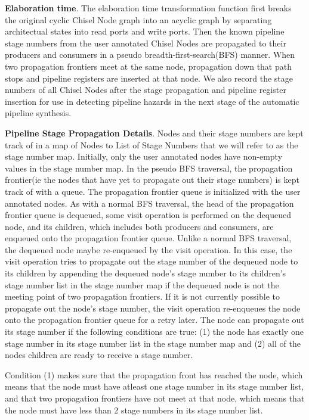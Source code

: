 {\bf Elaboration time}. The elaboration time transformation function first breaks the original cyclic Chisel Node graph into an acyclic graph by separating architectual states into read ports and write ports. Then the known pipeline stage numbers from the user annotated Chisel Nodes are propagated to their producers and consumers in a pseudo breadth-first-search(BFS) manner. When two propagation frontiers meet at the same node, propagation down that path stops and pipeline registers are inserted at that node. We also record the stage numbers of all Chisel Nodes after the stage propagation and pipeline register insertion for use in detecting pipeline hazards in the next stage of the automatic pipeline synthesis.

{\bf Pipeline Stage Propagation Details}. Nodes and their stage numbers are kept track of in a map of Nodes to List of Stage Numbers that we will refer to as the stage number map. Initially, only the user annotated nodes have non-empty values in the stage number map. In the pseudo BFS traversal, the propagation frontier(ie the nodes that have yet to propagate out their stage numbers) is kept track of with a queue. The propagation frontier queue is initialized with the user annotated nodes. As with a normal BFS traversal, the head of the propagation frontier queue is dequeued, some visit operation is performed on the dequeued node, and its children, which includes both producers and consumers, are enqueued onto the propagation frontier queue. Unlike a normal BFS traversal, the dequeued node maybe re-enqueued by the visit operation. In this case, the visit operation tries to propagate out the stage number of the dequeued node to its children by appending the dequeued node's stage number to its children's stage number list in the stage number map if the dequeued node is not the meeting point of two propagation frontiers. If it is not currently possible to propagate out the node's stage number, the visit operation re-enqueues the node onto the propagation frontier queue for a retry later. The node can propagate out its stage number if the following conditions are true: (1) the node has exactly one stage number in its stage number list in the stage number map and (2) all of the nodes children are ready to receive a stage number. 

Condition (1) makes sure that the propagation front has reached the node, which means that the node must have atleast one stage number in its stage number list, and that two propagation frontiers have not meet at that node, which means that the node must have less than 2 stage numbers in its stage number list. 

